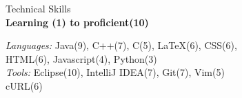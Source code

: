\newcommand{\mar}{\hspace{.5cm}}
\newcommand{\separator}{\mar\rule[3pt]{9cm}{1pt}\\}
\vspace{2.5cm}
\raggedright
\footnotesize
\begin{center}
{\fontsize{24}{50}\selectfont Technical Skills}\\
\textbf{Learning (1) to proficient(10)}\\
\end{center}
\vspace{5pt}
\mar \textit{Languages:} Java(9), C++(7),  C(5), LaTeX(6), CSS(6),\\
\hspace{2.25cm}HTML(6), Javascript(4), Python(3)\\
\vspace{5pt}
\mar \textit{Tools:} \hspace{17pt} Eclipse(10), IntelliJ IDEA(7), Git(7), Vim(5)\\
\hspace{2.25cm}cURL(6)\\